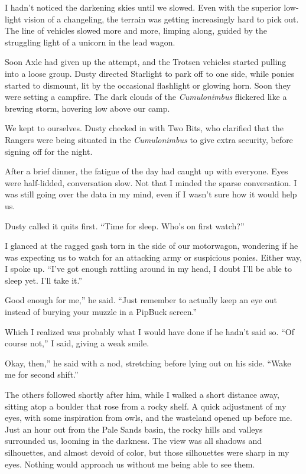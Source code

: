 I hadn’t noticed the darkening skies until we slowed. Even with the superior low-light vision of a changeling, the terrain was getting increasingly hard to pick out. The line of vehicles slowed more and more, limping along, guided by the struggling light of a unicorn in the lead wagon.

Soon Axle had given up the attempt, and the Trotsen vehicles started pulling into a loose group. Dusty directed Starlight to park off to one side, while ponies started to dismount, lit by the occasional flashlight or glowing horn. Soon they were setting a campfire. The dark clouds of the \textit{Cumulonimbus} flickered like a brewing storm, hovering low above our camp.

We kept to ourselves. Dusty checked in with Two Bits, who clarified that the Rangers were being situated in the \textit{Cumulonimbus} to give extra security, before signing off for the night.

After a brief dinner, the fatigue of the day had caught up with everyone. Eyes were half-lidded, conversation slow. Not that I minded the sparse conversation. I was still going over the data in my mind, even if I wasn’t sure how it would help us.

Dusty called it quits first. “Time for sleep. Who’s on first watch?”

I glanced at the ragged gash torn in the side of our motorwagon, wondering if he was expecting us to watch for an attacking army or suspicious ponies. Either way, I spoke up. “I’ve got enough rattling around in my head, I doubt I’ll be able to sleep yet. I’ll take it.”

\leavevmode{}Good enough for me,” he said. “Just remember to actually keep an eye out instead of burying your muzzle in a PipBuck screen.”

Which I realized was probably what I would have done if he hadn’t said so. “Of course not,” I said, giving a weak smile.

\leavevmode{}Okay, then,” he said with a nod, stretching before lying out on his side. “Wake me for second shift.”

The others followed shortly after him, while I walked a short distance away, sitting atop a boulder that rose from a rocky shelf. A quick adjustment of my eyes, with some inspiration from owls, and the wasteland opened up before me. Just an hour out from the Pale Sands basin, the rocky hills and valleys surrounded us, looming in the darkness. The view was all shadows and silhouettes, and almost devoid of color, but those silhouettes were sharp in my eyes. Nothing would approach us without me being able to see them.

